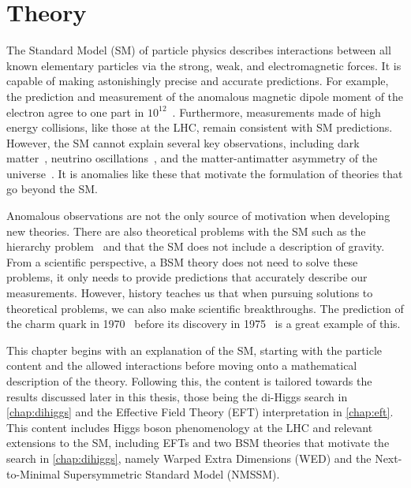 \chapter{Theory}\label{chap:theory}

The Standard Model (SM) of particle physics describes interactions between all known elementary particles via the strong, weak, and electromagnetic forces. It is capable of making astonishingly precise and accurate predictions. For example, the prediction and measurement of the anomalous magnetic dipole moment of the electron agree to one part in $10^{12}$~\cite{Fan:2022eto}. Furthermore, measurements made of high energy collisions, like those at the LHC, remain consistent with SM predictions. However, the SM cannot explain several key observations, including dark matter~\cite{Clowe:2006eq}, neutrino oscillations~\cite{Super-Kamiokande:1998kpq}, and the matter-antimatter asymmetry of the universe~\cite{Canetti:2012zc}. It is anomalies like these that motivate the formulation of theories that go beyond the SM.

Anomalous observations are not the only source of motivation when developing new theories. There are also theoretical problems with the SM such as the hierarchy problem~\cite{Thomson:2013zua} and that the SM does not include a description of gravity. From a scientific perspective, a BSM theory does not need to solve these problems, it only needs to provide predictions that accurately describe our measurements. However, history teaches us that when pursuing solutions to theoretical problems, we can also make scientific breakthroughs. The prediction of the charm quark in 1970~\cite{Glashow:1970gm} before its discovery in 1975~\cite{Cazzoli:1975et} is a great example of this.

This chapter begins with an explanation of the SM, starting with the particle content and the allowed interactions before moving onto a mathematical description of the theory. Following this, the content is tailored towards the results discussed later in this thesis, those being the di-Higgs search in \cref{chap:dihiggs} and the Effective Field Theory (EFT) interpretation in \cref{chap:eft}. This content includes Higgs boson phenomenology at the LHC and relevant extensions to the SM, including EFTs and two BSM theories that motivate the search in \cref{chap:dihiggs}, namely Warped Extra Dimensions (WED) and the Next-to-Minimal Supersymmetric Standard Model (NMSSM).



